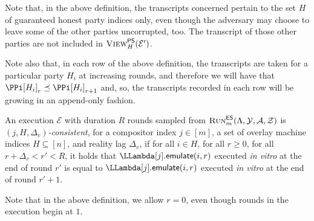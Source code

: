 Note that, in the above definition, the transcripts concerned pertain to the
set $H$ of guaranteed honest party indices only, even though the adversary may choose
to leave some of the other parties uncorrupted, too. The transcript of
those other parties are not included in $\textsc{View}^{\textsf{PS}}_H(\mathcal{E}')$.

Note also that, in each row of the above definition, the transcripts
are taken for a particular party $H_i$ at increasing rounds, and therefore
we will have that $\PPi[H_i]_r \preceq \PPi[H_i]_{r+1}$ and, so, the transcripts
recorded in each row will be growing in an append-only fashion.

\begin{definition}
  An execution $\mathcal{E}$ with duration $R$ rounds sampled from
  $\textsc{Run}^{\textsf{ES}}_m(\Lambda, \mathcal{Y}, \mathcal{A}, \mathcal{Z})$
  is \emph{$(j,H,\Delta_v)$-\emph{consistent}},
  for a compositor index $j \in [m]$,
  a set of overlay machine indices $H \subseteq [n]$,
  and reality lag $\Delta_v$,
  if
  for all $i \in H$, for all $r \geq 0$,
  for all $r + \Delta_v < r' < R$,
  it holds that
  $\LLambda[j].\emulateMachine(i, r)$ executed \emph{in vitro} at the end of round $r'$
  is equal to
  $\LLambda[j].\emulateMachine(i, r)$ executed \emph{in vitro} at the end of round $r' + 1$.
\end{definition}

Note that in the above definition, we allow $r = 0$, even though rounds
in the execution begin at $1$.


